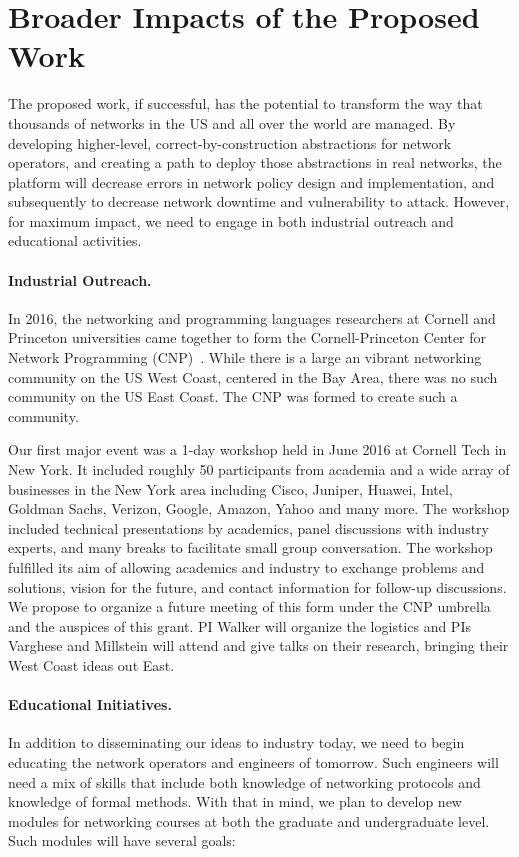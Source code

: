\section{Broader Impacts of the Proposed Work}
\label{sec:impact}

The proposed work, if successful, has the potential to transform the way
that thousands of networks in the US and all over the world are managed.
By developing higher-level, correct-by-construction abstractions for
network operators, and creating a path to deploy those abstractions
in real networks, the \Name platform will decrease
errors in network policy design and implementation, and subsequently
to decrease network downtime and vulnerability to attack.  However,
for maximum impact, we need to engage in both industrial outreach and
educational activities.

\paragraph*{Industrial Outreach.}
In 2016, the networking and programming languages
researchers at Cornell and Princeton universities came together
to form the Cornell-Princeton Center for Network 
Programming (CNP)~\cite{center-for-network-programming}.
While there is a large an vibrant networking community on the US
West Coast, centered in the Bay Area, there was no such community on
the US East Coast.  The CNP was formed to create such a community.

Our first major event was a 1-day workshop held in June 2016 at
Cornell Tech in New York.  It included roughly 50 participants from
academia and a wide array of businesses in the New York area including
Cisco, Juniper, Huawei, Intel, Goldman Sachs, Verizon, Google, Amazon,
Yahoo and many more.  The workshop included technical presentations by
academics, panel discussions with industry experts, and many breaks to
facilitate small group conversation.  The workshop fulfilled its aim
of allowing academics and industry to exchange problems and solutions,
vision for the future, and contact information for follow-up
discussions. We propose to organize a future meeting of this form
under the CNP umbrella and the auspices of this grant.  PI Walker will
organize the logistics and PIs Varghese and Millstein will attend and
give talks on their research, bringing their West Coast ideas out
East.

\paragraph*{Educational Initiatives.}
In addition to disseminating our ideas to industry today,
we need to begin educating the network operators and engineers 
of tomorrow.  Such engineers will need a mix of skills that include
both knowledge of networking protocols and knowledge of formal methods.
With that in mind, we plan to develop new modules for networking courses
at both the graduate and undergraduate level.  Such modules will have
several goals:

